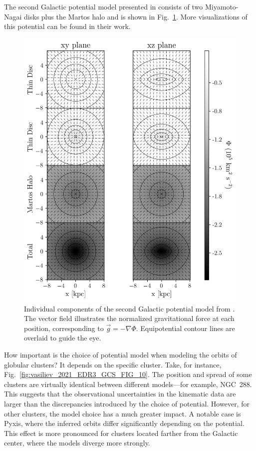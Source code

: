         The second Galactic potential model presented in \citet{2017A&A...598A..66P} consists of two Miyamoto-Nagai disks plus the Martos halo and is shown in Fig.~\ref{fig:figure_pouliasis2017pii_potential}. More visualizations of this potential can be found in their work.
        \begin{figure}
            \centering
            \includegraphics[width=\linewidth]{images/figure_pouliasis2017pii_potential_-8_8.png}
            \caption{Individual components of the second Galactic potential model from \citet{2017A&A...598A..66P}. The vector field illustrates the normalized gravitational force at each position, corresponding to $\vec{g} = -\nabla\Phi$. Equipotential contour lines are overlaid to guide the eye.}
            \label{fig:figure_pouliasis2017pii_potential}
        \end{figure}        
        How important is the choice of potential model when modeling the orbits of globular clusters? It depends on the specific cluster. Take, for instance, Fig.~\ref{fig:vasiliev_2021_EDR3_GCS_FIG_10}. The position and spread of some clusters are virtually identical between different models—for example, NGC~288. This suggests that the observational uncertainties in the kinematic data are larger than the discrepancies introduced by the choice of potential. However, for other clusters, the model choice has a much greater impact. A notable case is Pyxis, where the inferred orbits differ significantly depending on the potential. This effect is more pronounced for clusters located farther from the Galactic center, where the models diverge more strongly.

